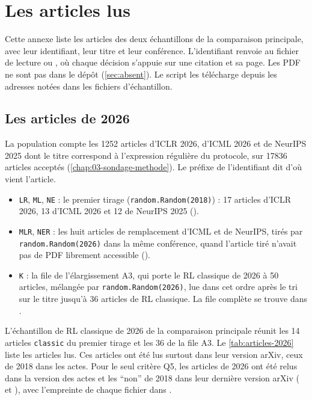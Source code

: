 \chapter{Les articles lus}
\label{chap:C-articles}

Cette annexe liste les articles des deux échantillons de la comparaison principale, avec leur
identifiant, leur titre et leur conférence. L'identifiant renvoie au fichier de lecture
 ou , où chaque
décision s'appuie sur une citation et sa page. Les PDF ne sont pas dans le dépôt
(\cref{sec:absent}). Le script  les télécharge depuis les adresses notées dans les
fichiers d'échantillon.

\section{Les articles de 2026}
\label{sec:c-2026}

La population compte les \num{1252} articles d'ICLR 2026, d'ICML 2026 et de NeurIPS 2025 dont le titre
correspond à l'expression régulière du protocole, sur \num{17836} articles acceptés
(\cref{chap:03-sondage-methode}). Le préfixe de l'identifiant dit d'où vient l'article.
\begin{itemize}
  \item \texttt{LR}, \texttt{ML}, \texttt{NE} : le premier tirage (\texttt{random.Random(2018)}) :
        17 articles d'ICLR 2026, 13 d'ICML 2026 et 12 de NeurIPS 2025 ().
  \item \texttt{MLR}, \texttt{NER} : les huit articles de remplacement d'ICML et de NeurIPS, tirés
        par \texttt{random.Random(2026)} dans la même conférence, quand l'article tiré n'avait pas de
        PDF librement accessible ().
  \item \texttt{K} : la file de l'élargissement A3, qui porte le RL classique de 2026 à 50 articles, mélangée par
        \texttt{random.Random(2026)}, lue dans cet ordre après le tri sur le titre jusqu'à 36
        articles de RL classique. La file complète se trouve dans
        .
\end{itemize}
L'échantillon de RL classique de 2026 de la comparaison principale réunit les 14 articles
\texttt{classic} du premier tirage et les 36 de la file A3. Le \cref{tab:articles-2026} liste les
articles lus. Ces articles ont été lus surtout dans leur version arXiv, ceux de 2018 dans les actes.
Pour le seul critère Q5, les articles de 2026 ont été relus dans la version des actes et les
\enquote{non} de 2018 dans leur dernière version arXiv (
et ), avec l'empreinte de chaque fichier dans .

